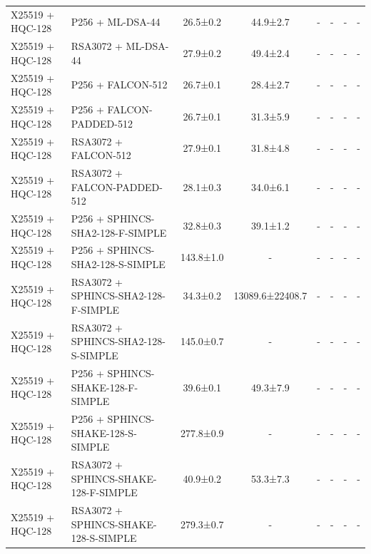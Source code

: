 \documentclass[10pt]{article}
\begin{document}
\begin{tabular}{@{}l l c c c c c c@{}}
X25519 + HQC-128 & P256 + ML-DSA-44 & 26.5±0.2 & 44.9±2.7 & - & - & - & - \\
X25519 + HQC-128 & RSA3072 + ML-DSA-44 & 27.9±0.2 & 49.4±2.4 & - & - & - & - \\
X25519 + HQC-128 & P256 + FALCON-512 & 26.7±0.1 & 28.4±2.7 & - & - & - & - \\
X25519 + HQC-128 & P256 + FALCON-PADDED-512 & 26.7±0.1 & 31.3±5.9 & - & - & - & - \\
X25519 + HQC-128 & RSA3072 + FALCON-512 & 27.9±0.1 & 31.8±4.8 & - & - & - & - \\
X25519 + HQC-128 & RSA3072 + FALCON-PADDED-512 & 28.1±0.3 & 34.0±6.1 & - & - & - & - \\
X25519 + HQC-128 & P256 + SPHINCS-SHA2-128-F-SIMPLE & 32.8±0.3 & 39.1±1.2 & - & - & - & - \\
X25519 + HQC-128 & P256 + SPHINCS-SHA2-128-S-SIMPLE & 143.8±1.0 & - & - & - & - & - \\
X25519 + HQC-128 & RSA3072 + SPHINCS-SHA2-128-F-SIMPLE & 34.3±0.2 & 13089.6±22408.7 & - & - & - & - \\
X25519 + HQC-128 & RSA3072 + SPHINCS-SHA2-128-S-SIMPLE & 145.0±0.7 & - & - & - & - & - \\
X25519 + HQC-128 & P256 + SPHINCS-SHAKE-128-F-SIMPLE & 39.6±0.1 & 49.3±7.9 & - & - & - & - \\
X25519 + HQC-128 & P256 + SPHINCS-SHAKE-128-S-SIMPLE & 277.8±0.9 & - & - & - & - & - \\
X25519 + HQC-128 & RSA3072 + SPHINCS-SHAKE-128-F-SIMPLE & 40.9±0.2 & 53.3±7.3 & - & - & - & - \\
X25519 + HQC-128 & RSA3072 + SPHINCS-SHAKE-128-S-SIMPLE & 279.3±0.7 & - & - & - & - & - \\
\bottomrule
\end{tabular}
\end{document}

